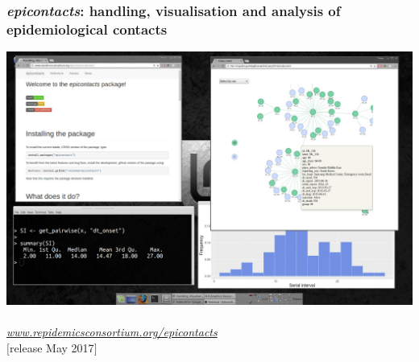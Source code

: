 \documentclass[xcolor=svgnames,mathserif]{beamer}
\begin{document}
\begin{frame}[fragile]
  \frametitle{\textit{epicontacts}: handling, visualisation and analysis of epidemiological contacts}


\begin{center} 

\includegraphics[width=.95\textwidth]{figs/epicontacts-demo}
~\\
{\scriptsize\emph{\url{www.repidemicsconsortium.org/epicontacts}}\\
  {\scriptsize $[$\alert{release May 2017}$]$}
}

\end{center}


\end{frame}
\end{document}
